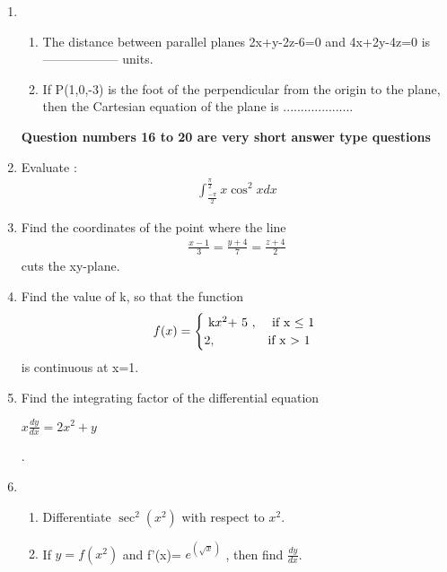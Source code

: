 \documentclass[journal,12pt,twocolumn]{IEEEtran}
\renewcommand\thesection{\arabic{section}}
\begin{document}
\begin{enumerate}[label=\thesection.\arabic*.,ref=\thesection.\theenumi]
\item  \begin{enumerate} \item The distance between parallel planes 2x+y-2z-6=0 and 4x+2y-4z=0 is ------------------ units.

\item If P(1,0,-3) is the foot of the perpendicular from the origin to the plane, then the Cartesian equation of the plane is .................... \\
\end{enumerate}
    
\textbf{Question numbers 16 to 20 are very short answer type questions}\\  
\item  Evaluate :
	\begin{align}
         \int_{\frac{-\pi}{2}}^{\frac{\pi}{2}} x \cos^2 x dx \nonumber
	\end{align}  

\item  Find the coordinates of the point where the line 
        \begin{align}
        \frac{x-1}{3} = \frac{y+4}{7} = \frac{z+4}{2}
        \nonumber
	\end{align} 
        cuts the xy-plane. \\

\item  Find the value of k, so that the function \begin{equation*}  f(x)  = \begin{cases}
                $ k$ x^2 $+ 5 $ ,  &\text{ if  x $\leq$ 1 } \\
        2 , &\text{if x $ > $ 1}
\end{cases} \end{equation*}  is continuous at x=1. \\
\item  Find the integrating factor of the differential equation \begin{center} $ x\frac{dy}{dx} = 2x^2 +y $ \end{center} .
\item \begin{enumerate} \item Differentiate $ \sec^2(x^2) $ with respect to $ x^2 $.
 \item If $y=f(x^2)$  and  f'(x)= $ e^{\left(\sqrt{x}\right)}$  , then find $\frac{dy}{dx}$.\\
\end{enumerate}

\end{enumerate}
\end{document}
